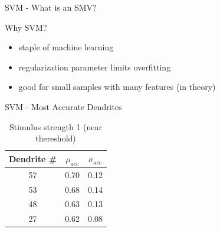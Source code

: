 \documentclass[10pt]{beamer}
\begin{document}
\begin{frame}[fragile]{SVM - What is an SMV?}
\begin{center}
	\end{center}
\end{frame}

\begin{frame}[fragile]{Why SVM?}

\begin{itemize}
\item staple of machine learning
\item regularization parameter limits overfitting
\item good for small samples with many features (in theory)
\end{itemize}

\end{frame}

\begin{frame}[fragile]{SVM - Most Accurate Dendrites}
\begin{table}
    \caption*{Stimulus strength 1 (near thereshold)}
    \begin{tabular}{c|c|c}
      \toprule
      Dendrite \# & $\mu_{acc}$ & $\sigma_{acc}$\\
      \midrule
      57 & 0.70 & 0.12\\
      53 & 0.68 & 0.14\\
      48 & 0.63 & 0.13\\
      27 & 0.62 & 0.08\\
      \bottomrule
    \end{tabular}
  \end{table}
\end{frame}
\end{document}
